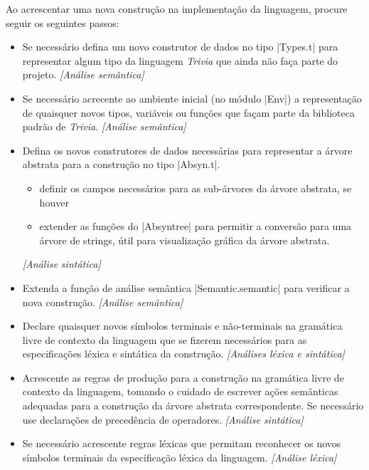 \documentclass[a4paper,11pt,brazil]{article}
\newcommand{\lang}{\textsl{Trivia}}
\begin{document}
Ao acrescentar uma nova construção na implementação da linguagem,
procure seguir os seguintes passos:
\begin{itemize}
  \item Se necessário defina um novo construtor de dados no tipo
  \pyginline|Types.t| para representar algum tipo da linguagem \lang{}
  que ainda não faça parte do projeto. \textit{[Análise semântica]}

  \item Se necessário acrecente ao ambiente inicial (no módulo
  \pyginline|Env|) a representação de quaisquer novos tipos, variáveis
  ou funções que façam parte da biblioteca padrão de
  \lang{}. \textit{[Análise semântica]}

  \item Defina os novos construtores de dados necessárias para
  representar a árvore abstrata para a construção no tipo
  \pyginline|Absyn.t|.
  \begin{itemize}[noitemsep]
    \item definir os campos necessários para as sub-árvores da árvore
    abstrata, se houver
    \item extender as funções do \pyginline|Absyntree| para permitir a
    conversão para uma árvore de strings, útil para visualização
    gráfica da árvore abstrata.
  \end{itemize}
  \textit{[Análise sintática]}

  \item Extenda a função de análise semântica
  \pyginline|Semantic.semantic| para verificar a nova
  construção. \textit{[Análise semântica]}

  \item Declare quaisquer novos símbolos terminais e não-terminais na
  gramática livre de contexto da linguagem que se fizerem necessários
  para as especificações léxica e sintática da
  construção. \textit{[Análises léxica e sintática]}

  \item Acrescente as regras de produção para a construção na
  gramática livre de contexto da linguagem, tomando o cuidado de
  escrever ações semânticas adequadas para a construção da árvore
  abstrata correspondente. Se necessário use declarações de
  precedência de operadores. \textit{[Análise sintática]}

  \item Se necessário acrescente regras léxicas que permitam
  reconhecer os novos símbolos terminais da especificação léxica da
  linguagem. \textit{[Análise léxica]}
\end{itemize}
\end{document}
